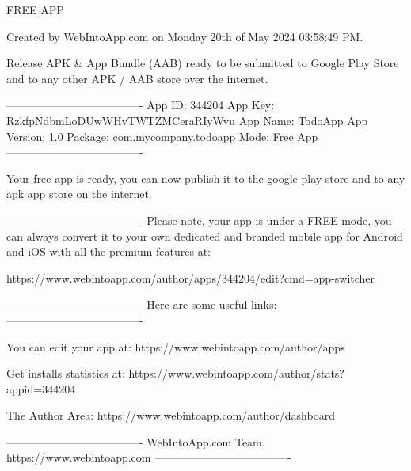 
FREE APP

Created by WebIntoApp.com on Monday 20th of May 2024 03:58:49 PM.

Release APK & App Bundle (AAB) ready to be submitted to Google Play Store 
and to any other APK / AAB store over the internet.

-------------------------------------
App ID:			344204
App Key:		RzkfpNdbmLoDUwWHvTWTZMCeraRIyWvu
App Name:		TodoApp
App Version:	1.0
Package:		com.mycompany.todoapp
Mode:			Free App
-------------------------------------

Your free app is ready, you can now publish it to the 
google play store and to any apk app store on the internet.

-------------------------------------
Please note, your app is under a FREE mode, you can always 
convert it to your own dedicated and branded mobile app for 
Android and iOS with all the premium features at:

https://www.webintoapp.com/author/apps/344204/edit?cmd=app-switcher

-------------------------------------
Here are some useful links:
-------------------------------------

You can edit your app at:
https://www.webintoapp.com/author/apps

Get installs statistics at:
https://www.webintoapp.com/author/stats?appid=344204

The Author Area:
https://www.webintoapp.com/author/dashboard

-------------------------------------
WebIntoApp.com Team.
https://www.webintoapp.com
-------------------------------------